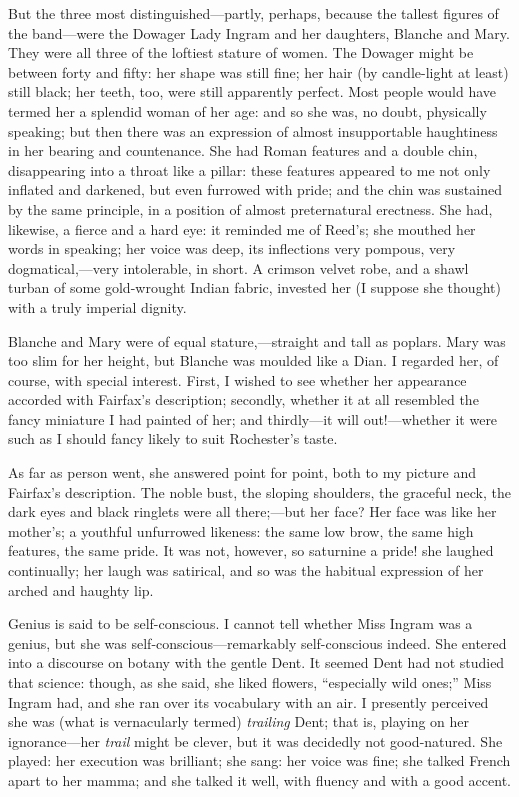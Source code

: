 But the three most distinguished---partly, perhaps, because the tallest
figures of the band---were the Dowager Lady Ingram and her daughters,
Blanche and Mary. They were all three of the loftiest stature of
women. The Dowager might be between forty and fifty: her shape was
still fine; her hair (by candle-light at least) still black; her teeth,
too, were still apparently perfect. Most people would have termed her a
splendid woman of her age: and so she was, no doubt, physically
speaking; but then there was an expression of almost insupportable
haughtiness in her bearing and countenance. She had Roman features and
a double chin, disappearing into a throat like a pillar: these features
appeared to me not only inflated and darkened, but even furrowed with
pride; and the chin was sustained by the same principle, in a position
of almost preternatural erectness. She had, likewise, a fierce and a
hard eye: it reminded me of \Mrs{} Reed's; she mouthed her words in
speaking; her voice was deep, its inflections very pompous, very
dogmatical,---very intolerable, in short. A crimson velvet robe, and a
shawl turban of some gold-wrought Indian fabric, invested her (I suppose
she thought) with a truly imperial dignity.

Blanche and Mary were of equal stature,---straight and tall as poplars. 
Mary was too slim for her height, but Blanche was moulded like a Dian. 
I regarded her, of course, with special interest. First, I wished to
see whether her appearance accorded with \Mrs{} Fairfax's description;
secondly, whether it at all resembled the fancy miniature I had painted
of her; and thirdly---it will out!---whether it were such as I should
fancy likely to suit \Mr{} Rochester's taste.

As far as person went, she answered point for point, both to my picture
and \Mrs{} Fairfax's description. The noble bust, the sloping shoulders,
the graceful neck, the dark eyes and black ringlets were all
there;---but her face? Her face was like her mother's; a youthful
unfurrowed likeness: the same low brow, the same high features, the same
pride. It was not, however, so saturnine a pride! she laughed
continually; her laugh was satirical, and so was the habitual expression
of her arched and haughty lip.

Genius is said to be self-conscious. I cannot tell whether Miss Ingram
was a genius, but she was self-conscious---remarkably self-conscious
indeed. She entered into a discourse on botany with the gentle \Mrs{}
Dent. It seemed \Mrs{} Dent had not studied that science: though, as she
said, she liked flowers, \enquote{especially wild ones;} Miss Ingram
had, and she ran over its vocabulary with an air. I presently perceived
she was (what is vernacularly termed) \emph{trailing} \Mrs{} Dent; that
is, playing on her ignorance---her \emph{trail} might be clever, but it
was decidedly not good-natured. She played: her execution was
brilliant; she sang: her voice was fine; she talked French apart to her
mamma; and she talked it well, with fluency and with a good accent.

